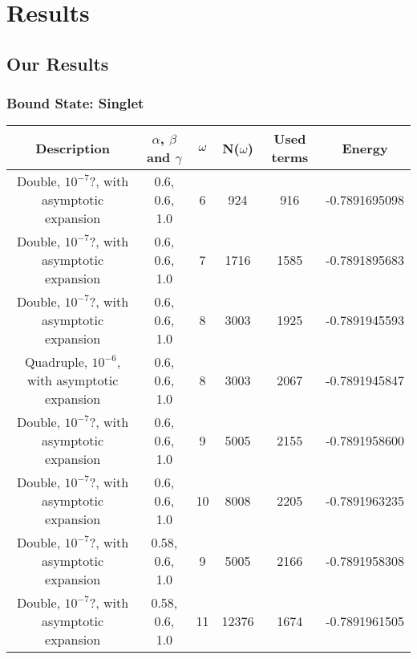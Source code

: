 \documentclass[Dissertation.tex]{subfiles}
\begin{document}
\chapter{Results}

\section{Our Results}
\subsection{Bound State: Singlet}

\begin{table}[H]
\begin{center}
\begin{tabular}{|c|c|c|c|c|c|}
\hline
Description & $\alpha$, $\beta$ and $\gamma$ & $\omega$ & N($\omega$) & Used terms & Energy\\
\hline
Double, $10^{-7}$?, with asymptotic expansion & 0.6, 0.6, 1.0 & 6 & 924 & 916 & -0.7891695098 \\
Double, $10^{-7}$?, with asymptotic expansion & 0.6, 0.6, 1.0 & 7 & 1716 & 1585 & -0.7891895683 \\
Double, $10^{-7}$?, with asymptotic expansion & 0.6, 0.6, 1.0 & 8 & 3003 & 1925 & -0.7891945593 \\
Quadruple, $10^{-6}$, with asymptotic expansion & 0.6, 0.6, 1.0 & 8 & 3003 & 2067 & -0.7891945847\\
Double, $10^{-7}$?, with asymptotic expansion & 0.6, 0.6, 1.0 & 9 & 5005 & 2155 & -0.7891958600 \\
\rowcolor{LightCyan}
Double, $10^{-7}$?, with asymptotic expansion & 0.6, 0.6, 1.0 & 10 & 8008 & 2205 & -0.7891963235 \\

Double, $10^{-7}$?, with asymptotic expansion & 0.58, 0.6, 1.0 & 9 & 5005 & 2166 & -0.7891958308\\
Double, $10^{-7}$?, with asymptotic expansion & 0.58, 0.6, 1.0 & 11 & 12376 & 1674 & -0.7891961505\\


\end{tabular}
\end{center}
\end{table}
\end{document}
